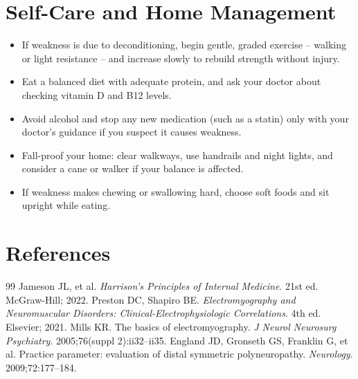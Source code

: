 \section*{Self-Care and Home Management}
\begin{itemize}
  \item If weakness is due to deconditioning, begin gentle, graded exercise -- walking or light resistance -- and increase slowly to rebuild strength without injury.
  \item Eat a balanced diet with adequate protein, and ask your doctor about checking vitamin D and B12 levels.
  \item Avoid alcohol and stop any new medication (such as a statin) only with your doctor's guidance if you suspect it causes weakness.
  \item Fall-proof your home: clear walkways, use handrails and night lights, and consider a cane or walker if your balance is affected.
  \item If weakness makes chewing or swallowing hard, choose soft foods and sit upright while eating.
\end{itemize}

\section*{References}
\begin{thebibliography}{99}
 Jameson JL, et al. \textit{Harrison's Principles of Internal Medicine}. 21st ed. McGraw-Hill; 2022.
 Preston DC, Shapiro BE. \textit{Electromyography and Neuromuscular Disorders: Clinical-Electrophysiologic Correlations}. 4th ed. Elsevier; 2021.
 Mills KR. The basics of electromyography. \textit{J Neurol Neurosurg Psychiatry}. 2005;76(suppl 2):ii32--ii35.
 England JD, Gronseth GS, Franklin G, et al. Practice parameter: evaluation of distal symmetric polyneuropathy. \textit{Neurology}. 2009;72:177--184.
\end{thebibliography}
